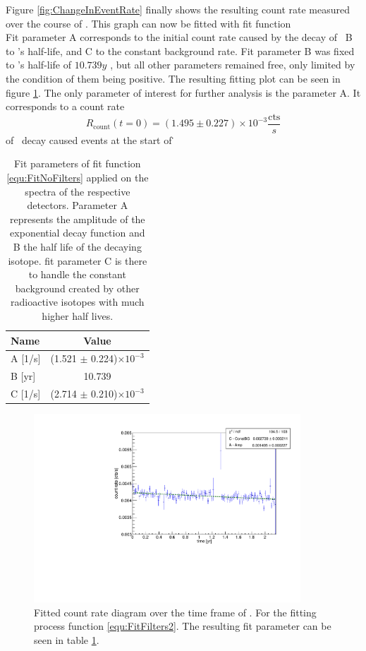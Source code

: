 Figure \ref{fig:ChangeInEventRate} finally shows the resulting count rate measured over the course of \PII.
This graph can now be fitted with fit function
\begin{equation}

\end{equation}
Fit parameter A corresponds to the initial count rate caused by the decay of \Kr\, B to \Kr's half-life, and C to the constant background rate.
Fit parameter B was fixed to \Kr's half-life of \(10.739\unit{y}\) , but all other parameters remained free, only limited by the condition of them being positive.
The resulting fitting plot can be seen in figure  \ref{fig:ChangeInEventRateFit}.
The only parameter of interest for further analysis is the parameter \(\mathrm{A}\). 
It corresponds to a count rate  
\begin{equation*}
R_{\mathrm{count}}(t = 0) = (1.495\pm0.227) \times 10^{-3} \frac{\mathrm{cts}}{\unit{s}}
\end{equation*}of \Kr\ decay caused events at the start of \PII\.

\begin{table}[t!]
	\centering
	\begin{tabular}{|l|c|}
		\hline
		Name 	& Value  \\ 
		\hline
		A [1/s] &	(1.521 $\pm$ 0.224)$\times10^{-3}$\\	
		\hline
		B [yr] &	10.739\\	
		\hline
		C [1/s] &	(2.714 $\pm$ 0.210)$\times10^{-3}$\\
		\hline
	\end{tabular}
	\caption{
		Fit parameters of fit function \ref{equ:FitNoFilters} applied on the spectra of the respective detectors.
		Parameter A represents the amplitude of the exponential decay function and B the half life of the decaying isotope.
		fit parameter C is there to handle the constant background created by other radioactive isotopes with much higher half lives.
	}
	\label{tab:FitParZeit}
\end{table}

\begin{figure}[t!]
	\centering
	\ifmakefigures%
	\includegraphics[width=100mm]{./Bilder/eventRateFit.pdf}
	\caption{
		Fitted count rate diagram over the time frame of \PII.
		For the fitting process function \ref{equ:FitFilters2}.
		The resulting fit parameter can be seen in table \ref{tab:FitParZeit}.
	}
	\label{fig:ChangeInEventRateFit}
\end{figure}%

